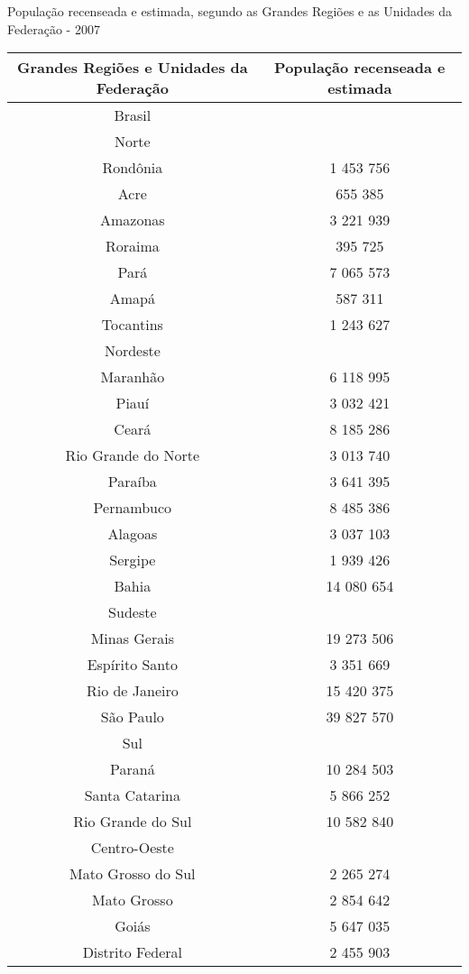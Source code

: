 População recenseada e estimada, segundo as Grandes Regiões e as
Unidades da Federação - 2007
\begin{tabular}{c | c}
Grandes Regiões e Unidades da Federação &
População recenseada e estimada \\
\hline
Brasil
& \\
\hline
Norte &
\\
\hline
Rondônia &
1 453 756 \\
\hline
Acre &
655 385 \\
\hline
Amazonas &
3 221 939 \\
\hline
Roraima &
395 725 \\
\hline
Pará &
7 065 573 \\
\hline
Amapá &
587 311 \\
\hline
Tocantins &
1 243 627 \\
\hline
Nordeste &
\\
\hline
Maranhão & 6 118 995 \\
\hline
Piauí & 3 032 421 \\
\hline
Ceará & 8 185 286 \\
\hline
Rio Grande do Norte & 3 013 740 \\
\hline
Paraíba & 3 641 395 \\
\hline
Pernambuco & 8 485 386 \\
\hline
Alagoas & 3 037 103 \\
\hline
Sergipe & 1 939 426 \\
\hline
Bahia & 14 080 654 \\
\hline
Sudeste &
\\
\hline
Minas Gerais & 19 273 506 \\
\hline
Espírito Santo & 3 351 669 \\
\hline
Rio de Janeiro & 15 420 375 \\
\hline
São Paulo & 39 827 570 \\
\hline
Sul &
\\
\hline
Paraná & 10 284 503 \\
\hline
Santa Catarina & 5 866 252 \\
\hline
Rio Grande do Sul & 10 582 840 \\
\hline
Centro-Oeste &
\\
\hline
Mato Grosso do Sul & 2 265 274 \\
\hline
Mato Grosso & 2 854 642 \\
\hline
Goiás & 5 647 035 \\
\hline
Distrito Federal & 2 455 903 \\
\hline
\end{tabular}

